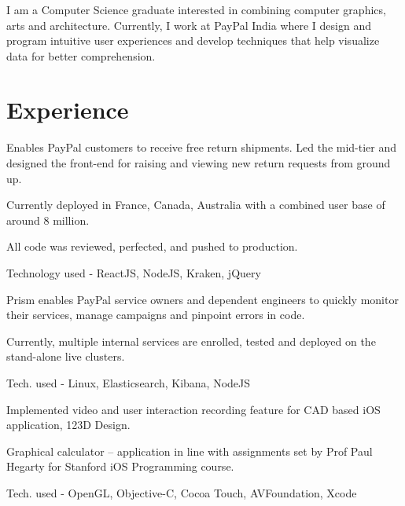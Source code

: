 \documentclass[]{deedy-resume-openfont}
\begin{document}
\hfill
\begin{minipage}[t]{0.66\textwidth} 

\subsubsection*{}
I am a Computer Science graduate interested in combining computer graphics, arts and architecture. Currently, I work at PayPal India where I design and program intuitive user experiences and develop techniques that help visualize data for better comprehension.
\section{Experience}

\vspace{\topsep}
 Enables PayPal customers to receive free return shipments. Led the mid-tier and designed the front-end for raising and viewing new return requests from ground up.
\begin{tightemize}
\vspace{\topsep}
\item Currently deployed in France, Canada, Australia with a combined user base of around 8 million.
\item All code was reviewed, perfected, and pushed to production.
\item Technology used - ReactJS, NodeJS, Kraken, jQuery
\end{tightemize}
\vspace{\topsep}

 Prism enables PayPal service owners and dependent engineers to quickly monitor their services, manage campaigns and pinpoint errors in code.
\begin{tightemize}
\item Currently, multiple internal services are enrolled, tested and deployed on the stand-alone live clusters.
\item Tech. used - Linux, Elasticsearch, Kibana, NodeJS
\end{tightemize}

\sectionsep
\vspace{\topsep}

\begin{tightemize}
\item Implemented video and user interaction recording feature for CAD based iOS application, 123D Design.
\item Graphical calculator – application in line with assignments set by Prof Paul Hegarty for Stanford iOS Programming course.
\item Tech. used - OpenGL, Objective-C, Cocoa Touch, AVFoundation, Xcode
\end{tightemize}
\sectionsep


\end{minipage}
\end{document}
